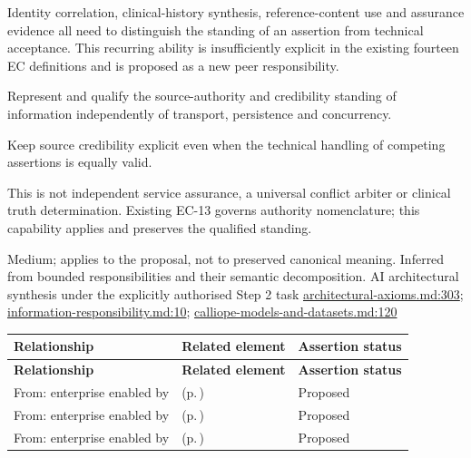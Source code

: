 Identity correlation, clinical-history synthesis, reference-content use and assurance evidence all need to distinguish the standing of an assertion from technical acceptance. This recurring ability is insufficiently explicit in the existing fourteen EC definitions and is proposed as a new peer responsibility.



Represent and qualify the source-authority and credibility standing of information independently of transport, persistence and concurrency.



Keep source credibility explicit even when the technical handling of competing assertions is equally valid.



This is not independent service assurance, a universal conflict arbiter or clinical truth determination. Existing EC-13 governs authority nomenclature; this capability applies and preserves the qualified standing.


Medium; applies to the proposal, not to preserved canonical meaning.
Inferred from bounded responsibilities and their semantic decomposition. AI architectural synthesis under the explicitly authorised Step 2 task \hyperref[evidence:27549d51551beae6]{architectural-axioms.md:303}; \hyperref[evidence:be61392fefb4bb10]{information-responsibility.md:10}; \hyperref[evidence:e0aea98a63ef9e8e]{calliope-models-and-datasets.md:120}
\begingroup\small\setlength{\TableWidth}{\dimexpr\linewidth-6\tabcolsep-4\arrayrulewidth\relax}
\begin{longtable}{|>{\raggedright\arraybackslash}p{0.27\TableWidth}|>{\raggedright\arraybackslash}p{0.48\TableWidth}|>{\raggedright\arraybackslash}p{0.25\TableWidth}|}
\hline\rowcolor{TableHead}\textbf{Relationship} & \textbf{Related element} & \textbf{Assertion status}\\\hline\endfirsthead
\hline\rowcolor{TableHead}\textbf{Relationship} & \textbf{Related element} & \textbf{Assertion status}\\\hline\endhead
\hline\endfoot
From: enterprise enabled by & \nameref{cap:bec-patient-clinical-record} (p.\,\pageref{cap:bec-patient-clinical-record}) & Proposed\\\hline
From: enterprise enabled by & \nameref{cap:bec-person-identity} (p.\,\pageref{cap:bec-person-identity}) & Proposed\\\hline
From: enterprise enabled by & \nameref{cap:bec-governed-reference-dataset-administration} (p.\,\pageref{cap:bec-governed-reference-dataset-administration}) & Proposed\\\hline
\end{longtable}\endgroup

